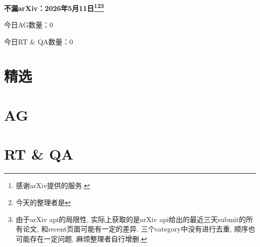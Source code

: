 \documentclass[9pt, a4paper]{article}
\theoremstyle{plain}
\theoremstyle{definition}
\theoremstyle{remark}
\newcommand{\AGnumber}{0}
\newcommand{\RTQAnumber}{0}
\newcommand{\NewestDate}{2026年5月11日}
\newcommand{\todayarXiver}{} %
\begin{document}
\begin{center}
    \Huge\textbf{不漏arXiv：\NewestDate\footnote{感谢arXiv提供的服务.}\footnote{今天的整理者是\todayarXiver}\footnote{由于arXiv api的局限性, 实际上获取的是arXiv api给出的最近三天submit的所有论文, 和recent页面可能有一定的差异. 三个category中没有进行去重, 顺序也可能存在一定问题, 麻烦整理者自行增删.}} \\
\end{center}

\setcounter{section}{-1}

\begin{center}
    今日AG数量：\AGnumber
    
    今日RT \& QA数量：\RTQAnumber
    
\end{center}


\section{精选}


\section{AG}

\section{RT \& QA}
\end{document}
